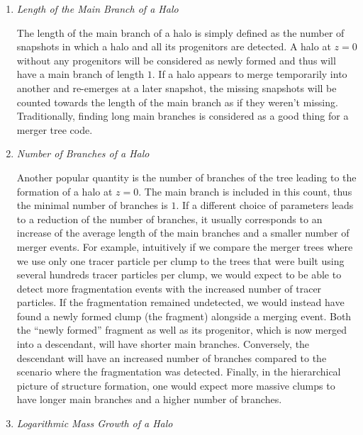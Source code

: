 \begin{enumerate}
  \setlength\itemsep{1em}
\item \emph{Length of the Main Branch of a Halo}

  The length of the main branch of a halo is simply defined as the
  number of snapshots in which a halo and all its progenitors are
  detected.  A halo at $z=0$ without any progenitors will be
  considered as newly formed and thus will have a main branch of
  length $1$.  If a halo appears to merge temporarily into another and
  re-emerges at a later snapshot, the missing snapshots will be
  counted towards the length of the main branch as if they weren't
  missing. Traditionally, finding long main branches is considered
  as a good thing for a merger tree code.

\item \emph{Number of Branches of a Halo}

  Another popular quantity is the number of branches of the tree
  leading to the formation of a halo at $z=0$.  The main branch is
  included in this count, thus the minimal number of branches is
  $1$. If a different choice of parameters leads to a reduction of the
  number of branches, it usually corresponds to an increase of the
  average length of the main branches and a smaller number of merger
  events. For example, intuitively if we compare the merger trees where
  we use only one tracer particle per clump to the trees that were built
  using several hundreds tracer particles per clump, we would expect to
  be able to detect more fragmentation events with the increased number of
  tracer particles. If the fragmentation remained undetected, we would
  instead have found a newly formed clump (the fragment) alongside a
  merging event. Both the ``newly formed'' fragment as well as its
  progenitor, which is now merged into a descendant, will have shorter
  main branches. Conversely, the descendant will have an increased
  number of branches compared to the scenario where the fragmentation
  was detected.
  Finally, in the hierarchical picture of structure formation, one
  would expect more massive clumps to have longer main branches and a
  higher number of branches.

\item \emph{Logarithmic Mass Growth of a Halo}


\end{enumerate}
